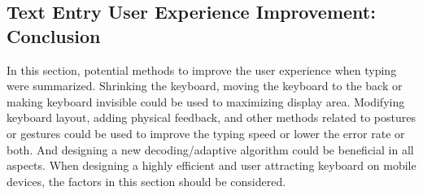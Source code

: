 \documentclass[11pt]{article}
\begin{document}
\subsection{Text Entry User Experience Improvement: Conclusion}
In this section, potential methods to improve the user experience when typing were summarized. Shrinking the keyboard, moving the keyboard to the back or making keyboard invisible could be used to maximizing display area. Modifying keyboard layout, adding physical feedback, and other methods related to postures or gestures could be used to improve the typing speed or lower the error rate or both. And designing a new decoding/adaptive algorithm could be beneficial in all aspects. When designing a highly efficient and user attracting keyboard on mobile devices, the factors in this section should be considered.

\newpage


\end{document}
